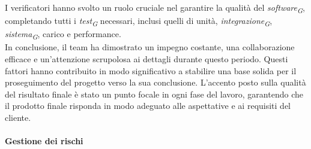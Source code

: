 I verificatori hanno svolto un ruolo cruciale nel garantire la qualità del \textit{software}\textsubscript{\textit{G}}, completando tutti i \textit{test}\textsubscript{\textit{G}} necessari, inclusi quelli di unità, \textit{integrazione}\textsubscript{\textit{G}}, \textit{sistema}\textsubscript{\textit{G}}, carico e performance. \\
In conclusione, il team ha dimostrato un impegno costante, una collaborazione efficace e un'attenzione scrupolosa ai dettagli durante questo periodo. Questi fattori hanno contribuito in modo significativo a stabilire una base solida per il proseguimento del progetto verso la sua conclusione. L'accento posto sulla qualità del risultato finale è stato un punto focale in ogni fase del lavoro, garantendo che il prodotto finale risponda in modo adeguato alle aspettative e ai requisiti del cliente.


\paragraph{Gestione dei rischi}

